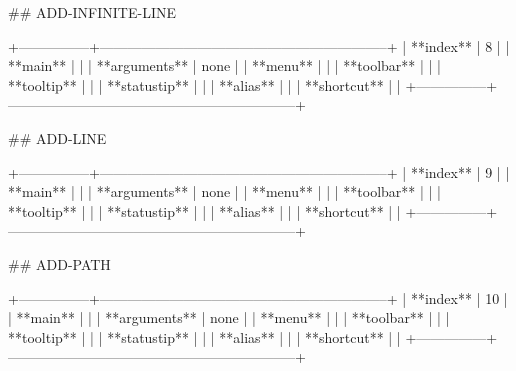 ## ADD-INFINITE-LINE

+---------------+--------------------------------------------------------------+
| **index**     | 8                                                            |
| **main**      |                                                              |
| **arguments** | none                                                         |
| **menu**      |                                                              |
| **toolbar**   |                                                              |
| **tooltip**   |                                                              |
| **statustip** |                                                              |
| **alias**     |                                                              |
| **shortcut**  |                                                              |
+---------------+--------------------------------------------------------------+


## ADD-LINE

+---------------+--------------------------------------------------------------+
| **index**     | 9                                                            |
| **main**      |                                                              |
| **arguments** | none                                                         |
| **menu**      |                                                              |
| **toolbar**   |                                                              |
| **tooltip**   |                                                              |
| **statustip** |                                                              |
| **alias**     |                                                              |
| **shortcut**  |                                                              |
+---------------+--------------------------------------------------------------+

## ADD-PATH

+---------------+--------------------------------------------------------------+
| **index**     | 10                                                           |
| **main**      |                                                              |
| **arguments** | none                                                         |
| **menu**      |                                                              |
| **toolbar**   |                                                              |
| **tooltip**   |                                                              |
| **statustip** |                                                              |
| **alias**     |                                                              |
| **shortcut**  |                                                              |
+---------------+--------------------------------------------------------------+

